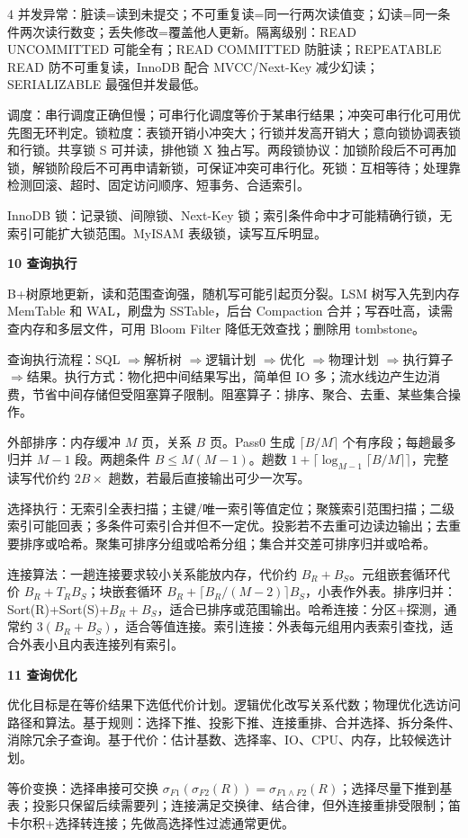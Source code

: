 \documentclass[UTF8]{ctexart}
\newcommand{\blk}[1]{\vspace{0.8pt}\noindent\colorbox{black!10}{\parbox{\dimexpr\linewidth-2\fboxsep}{\bfseries #1}}\vspace{0.6pt}}
\newcommand{\tri}{$\Rightarrow$}
\begin{document}
\begin{multicols*}{4}
并发异常：脏读=读到未提交；不可重复读=同一行两次读值变；幻读=同一条件两次读行数变；丢失修改=覆盖他人更新。隔离级别：READ UNCOMMITTED 可能全有；READ COMMITTED 防脏读；REPEATABLE READ 防不可重复读，InnoDB 配合 MVCC/Next-Key 减少幻读；SERIALIZABLE 最强但并发最低。

调度：串行调度正确但慢；可串行化调度等价于某串行结果；冲突可串行化可用优先图无环判定。锁粒度：表锁开销小冲突大；行锁并发高开销大；意向锁协调表锁和行锁。共享锁 S 可并读，排他锁 X 独占写。两段锁协议：加锁阶段后不可再加锁，解锁阶段后不可再申请新锁，可保证冲突可串行化。死锁：互相等待；处理靠检测回滚、超时、固定访问顺序、短事务、合适索引。

InnoDB 锁：记录锁、间隙锁、Next-Key 锁；索引条件命中才可能精确行锁，无索引可能扩大锁范围。MyISAM 表级锁，读写互斥明显。

\blk{10 查询执行}
B+树原地更新，读和范围查询强，随机写可能引起页分裂。LSM 树写入先到内存 MemTable 和 WAL，刷盘为 SSTable，后台 Compaction 合并；写吞吐高，读需查内存和多层文件，可用 Bloom Filter 降低无效查找；删除用 tombstone。

查询执行流程：SQL \tri 解析树 \tri 逻辑计划 \tri 优化 \tri 物理计划 \tri 执行算子 \tri 结果。执行方式：物化把中间结果写出，简单但 IO 多；流水线边产生边消费，节省中间存储但受阻塞算子限制。阻塞算子：排序、聚合、去重、某些集合操作。

外部排序：内存缓冲 $M$ 页，关系 $B$ 页。Pass0 生成 $\lceil B/M\rceil$ 个有序段；每趟最多归并 $M-1$ 段。两趟条件 $B\le M(M-1)$。趟数 $1+\lceil\log_{M-1}\lceil B/M\rceil\rceil$，完整读写代价约 $2B\times$ 趟数，若最后直接输出可少一次写。

选择执行：无索引全表扫描；主键/唯一索引等值定位；聚簇索引范围扫描；二级索引可能回表；多条件可索引合并但不一定优。投影若不去重可边读边输出；去重要排序或哈希。聚集可排序分组或哈希分组；集合并交差可排序归并或哈希。

连接算法：一趟连接要求较小关系能放内存，代价约 $B_R+B_S$。元组嵌套循环代价 $B_R+T_RB_S$；块嵌套循环 $B_R+\lceil B_R/(M-2)\rceil B_S$，小表作外表。排序归并：Sort(R)+Sort(S)+$B_R+B_S$，适合已排序或范围输出。哈希连接：分区+探测，通常约 $3(B_R+B_S)$，适合等值连接。索引连接：外表每元组用内表索引查找，适合外表小且内表连接列有索引。

\blk{11 查询优化}
优化目标是在等价结果下选低代价计划。逻辑优化改写关系代数；物理优化选访问路径和算法。基于规则：选择下推、投影下推、连接重排、合并选择、拆分条件、消除冗余子查询。基于代价：估计基数、选择率、IO、CPU、内存，比较候选计划。

等价变换：选择串接可交换 $\sigma_{F1}(\sigma_{F2}(R))=\sigma_{F1\land F2}(R)$；选择尽量下推到基表；投影只保留后续需要列；连接满足交换律、结合律，但外连接重排受限制；笛卡尔积+选择转连接；先做高选择性过滤通常更优。


\end{multicols*}
\end{document}
